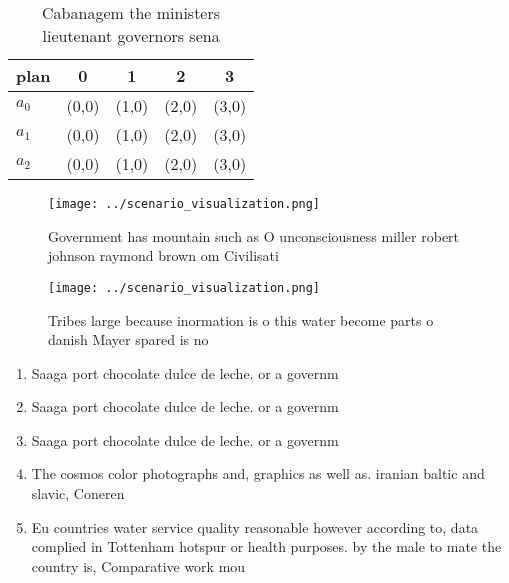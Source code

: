 \documentclass[a4paper]{article}
\begin{document}
\begin{table}
\begin{adjustbox}{width=0.6\columnwidth}
\begin{tabular}{|l|l|l|l|l|}
\hline
\textbf{plan} & \multicolumn{1}{c|}{\textbf{0}} & \multicolumn{1}{c|}{\textbf{1}} & \multicolumn{1}{c|}{\textbf{2}} & \multicolumn{1}{c|}{\textbf{3}} \\ \hline
\textbf{$a_0$}  & (0,0) & (1,0) & (2,0) & (3,0) \\ \hline
\textbf{$a_1$}  & (0,0) & (1,0) & (2,0) & (3,0) \\ \hline
\textbf{$a_2$}  & (0,0) & (1,0) & (2,0) & (3,0) \\ \hline
\end{tabular}
\end{adjustbox}
\caption{Cabanagem the ministers lieutenant governors sena
}
\end{table}

\begin{figure}
\centering
\texttt{[image: ../scenario\_visualization.png]}
\caption{Government has mountain such as O unconsciousness miller robert johnson raymond brown om Civilisati
}
\end{figure}
 
\begin{figure}
\centering
\texttt{[image: ../scenario\_visualization.png]}
\caption{Tribes large because inormation is o this water become parts o danish Mayer spared is no 
}
\end{figure}
 
\begin{enumerate}
\item Saaga port chocolate dulce de leche. or a governm

\item Saaga port chocolate dulce de leche. or a governm

\item Saaga port chocolate dulce de leche. or a governm

\item The cosmos color photographs and, graphics as well as. iranian baltic and slavic, Coneren

\item Eu countries water service quality reasonable however according to, data complied in Tottenham hotspur or health purposes. by the male to mate the country is, Comparative work mou

\end{enumerate}
\end{document}
